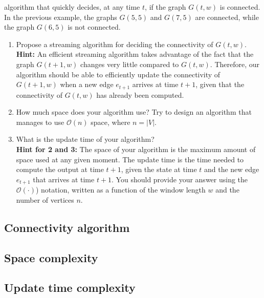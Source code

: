 algorithm that quickly decides, at any time $t$, if the graph $G(t,w)$ is connected. In the previous example, the graphs $G(5,5)$ and $G(7,5)$ are connected, while the graph $G(6,5)$ is not connected.
\begin{enumerate}
	\item Propose a streaming algorithm for deciding the connectivity of $G(t,w)$.\\
	\textbf{Hint:} An efficient streaming algorithm takes advantage of the fact that the graph $G(t+1,w)$ changes very little compared to $G(t,w)$. Therefore, our algorithm should be able to efficiently update the connectivity of $G(t + 1,w)$ when a new edge $e_{t+1}$ arrives at time $t + 1$, given that the connectivity of $G(t,w)$ has already been computed.
	\item How much space does your algorithm use? Try to design an algorithm that manages to use
	$\mathcal{O}(n)$ space, where $n = |V|$.
	\item What is the update time of your algorithm?\\
	\textbf{Hint for 2 and 3:} The space of your algorithm is the maximum amount of space used at
	any given moment. The update time is the time needed to compute the output at time $t+1$,
	given the state at time $t$ and the new edge $e_{t+1}$ that arrives at time $t + 1$. You should provide your answer using the $\mathcal{O}(\cdot)$) notation, written as a function of the window length $w$ and the number of vertices $n$.
\end{enumerate}

\subsection{Connectivity algorithm}

\subsection{Space complexity}

\subsection{Update time complexity}